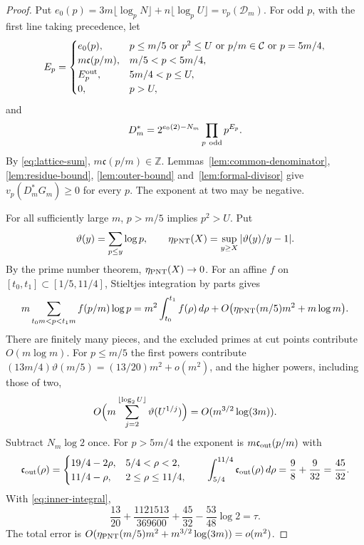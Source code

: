 \documentclass{amsart}
\numberwithin{equation}{section}
\numberwithin{table}{section}
\newcommand{\Z}{\mathbb{Z}}
\begin{document}
\begin{proof}
Put $e_0(p)=3m\lfloor\log_pN\rfloor+n\lfloor\log_pU\rfloor=v_p(\mathcal D_m)$.
For odd $p$, with the first line taking precedence, let
\begin{equation}\label{eq:prime-exponents}
 E_p=\begin{cases}
 e_0(p),&p\le m/5\ \text{or}\ p^2\le U\ \text{or}\
                p/m\in\mathcal C\ \text{or}\ p=5m/4,\\
 m\mathfrak c(p/m),&m/5<p<5m/4,\\
 E_p^{\rm out},&5m/4<p\le U,\\
 0,&p>U,
 \end{cases}
\end{equation}
and
\[
 D_m^*=2^{e_0(2)-N_m}\prod_{p\ {\rm odd}}p^{E_p}.
\]
By \eqref{eq:lattice-sum}, $m\mathfrak c(p/m)\in\Z$. Lemmas~\ref{lem:common-denominator},
\ref{lem:residue-bound}, \ref{lem:outer-bound} and~\ref{lem:formal-divisor}
give $v_p(D_m^*G_m)\ge0$ for every $p$. The exponent at two may be
negative.

For all sufficiently large $m$, $p>m/5$ implies $p^2>U$. Put
\[
 \vartheta(y)=\sum_{p\le y}\log p,\qquad
 \eta_{\rm PNT}(X)=\sup_{y\ge X}|\vartheta(y)/y-1|.
\]
By the prime number theorem, $\eta_{\rm PNT}(X)\to0$.
For an affine $f$ on $[t_0,t_1]\subset[1/5,11/4]$, Stieltjes integration by
parts gives
\begin{equation*}
 m\sum_{t_0m<p<t_1m} f(p/m)\log p
 =m^2\int_{t_0}^{t_1} f(\rho)\,d\rho
  +O\bigl(\eta_{\rm PNT}(m/5)m^2+m\log m\bigr).
\end{equation*}
There are finitely many pieces, and the excluded primes at cut points
contribute $O(m\log m)$. For $p\le m/5$ the first powers contribute
$(13m/4)\vartheta(m/5)=(13/20)m^2+o(m^2)$, and the higher powers, including
those of two,
\[
 O\Bigl(m\sum_{j=2}^{\lfloor\log_2U\rfloor}\vartheta(U^{1/j})\Bigr)
 =O(m^{3/2}\log(3m)).
\]
Subtract $N_m\log2$ once. For $p>5m/4$ the exponent is $m\mathfrak c_{\rm out}(p/m)$
with
\[
 \mathfrak c_{\rm out}(\rho)=\begin{cases}
 19/4-2\rho,&5/4<\rho<2,\\
 11/4-\rho,&2\le\rho\le11/4,
 \end{cases}
 \qquad
 \int_{5/4}^{11/4}\mathfrak c_{\rm out}(\rho)\,d\rho=\frac98+\frac9{32}=\frac{45}{32}.
\]
With \eqref{eq:inner-integral},
\[
 \frac{13}{20}+\frac{1121513}{369600}+\frac{45}{32}
 -\frac{53}{48}\log2=\tau.
\]
The total error is
$O(\eta_{\rm PNT}(m/5)m^2+m^{3/2}\log(3m))=o(m^2)$.
\end{proof}
\end{document}
